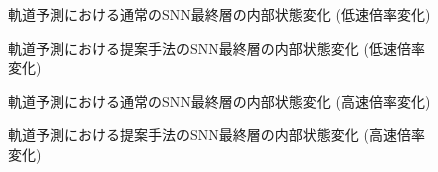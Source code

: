 \begin{figure}[htbp] %
    \centering
    
    \caption{
        軌道予測における通常のSNN最終層の内部状態変化 (低速倍率変化)
        }
    \label{fig:discussion3:snn:a3}
\end{figure}

\begin{figure}[htbp] %
    \centering
    
    \caption{
        軌道予測における提案手法のSNN最終層の内部状態変化 (低速倍率変化)
        }
    \label{fig:discussion3:dyna:a3}
\end{figure}


\begin{figure}[htbp] %
    \centering
    
    \caption{
        軌道予測における通常のSNN最終層の内部状態変化 (高速倍率変化)
        }
    \label{fig:discussion3:snn:a05}
\end{figure}

\begin{figure}[htbp] %
    \centering
    
    \caption{
        軌道予測における提案手法のSNN最終層の内部状態変化 (高速倍率変化)
        }
    \label{fig:discussion3:dyna:a05}
\end{figure}
